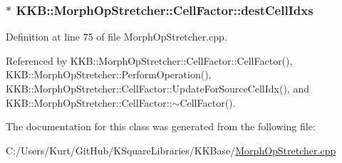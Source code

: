 \subsubsection[{\texorpdfstring{dest\+Cell\+Idxs}{destCellIdxs}}]{$\ast$ K\+K\+B\+::\+Morph\+Op\+Stretcher\+::\+Cell\+Factor\+::dest\+Cell\+Idxs}\hypertarget{class_morph_op_stretcher_1_1_cell_factor_ad98db8b4eb2b3513ad0a592250bacc06}{}\label{class_morph_op_stretcher_1_1_cell_factor_ad98db8b4eb2b3513ad0a592250bacc06}


Definition at line 75 of file Morph\+Op\+Stretcher.\+cpp.



Referenced by K\+K\+B\+::\+Morph\+Op\+Stretcher\+::\+Cell\+Factor\+::\+Cell\+Factor(), K\+K\+B\+::\+Morph\+Op\+Stretcher\+::\+Perform\+Operation(), K\+K\+B\+::\+Morph\+Op\+Stretcher\+::\+Cell\+Factor\+::\+Update\+For\+Source\+Cell\+Idx(), and K\+K\+B\+::\+Morph\+Op\+Stretcher\+::\+Cell\+Factor\+::$\sim$\+Cell\+Factor().



The documentation for this class was generated from the following file\+:\begin{DoxyCompactItemize}
\item 
C\+:/\+Users/\+Kurt/\+Git\+Hub/\+K\+Square\+Libraries/\+K\+K\+Base/\hyperlink{_morph_op_stretcher_8cpp}{Morph\+Op\+Stretcher.\+cpp}\end{DoxyCompactItemize}
